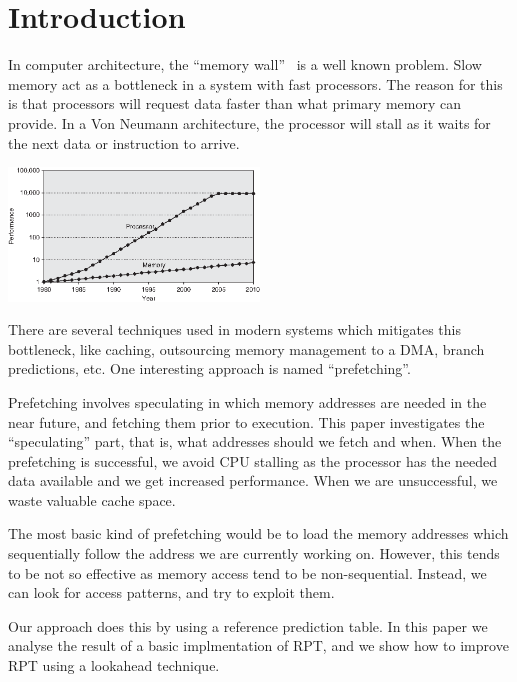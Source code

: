 \section{Introduction} %


In computer architecture, the ``memory wall''~\cite{wulf_mckee_1995}
is a well known problem. Slow memory act as a bottleneck in a system
with fast processors. The reason for this is that processors will
request data faster than what primary memory can provide. In a Von
Neumann architecture, the processor
will stall as it waits for the next data or instruction to arrive.

\begin{center}
  \includegraphics[width=0.5\textwidth]{graphs/memorywall}
\end{center}

There are several techniques used in modern systems which mitigates
this bottleneck, like caching, outsourcing memory management to a DMA,
branch predictions, etc. One interesting approach is named
``prefetching''.

Prefetching involves speculating in which memory
addresses are needed in the near future, and fetching them prior to
execution. This paper investigates the ``speculating'' part, that is,
what addresses should we fetch and when. When the prefetching is
successful, we avoid CPU stalling as the processor has the needed data
available and we get increased performance. When we are unsuccessful,
we waste valuable cache space.

The most basic kind of prefetching would be to load the memory
addresses which sequentially follow the address we are currently
working on. However, this tends to be not so effective as memory
access tend to be non-sequential. Instead, we can look for access
patterns, and try to exploit them.

Our approach does this by using a reference prediction table.
In this paper we analyse the result of a basic implmentation of RPT,
and we show how to improve RPT using a lookahead technique.

